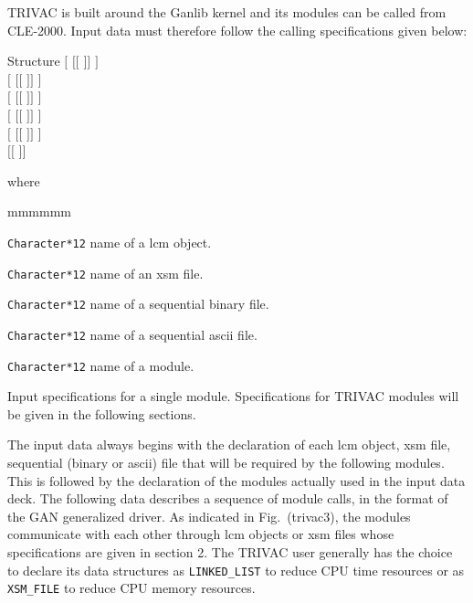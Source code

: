 TRIVAC is built around the Ganlib kernel and its modules can be called from CLE-2000.\cite{ganlib5,cle2000} Input data must therefore follow the calling specifications given below:

\begin{DataStructure}{Structure }
$[$  $[[$  $]]$ \moc{;} $]$ \\
$[$  $[[$  $]]$ \moc{;} $]$ \\
$[$  $[[$  $]]$ \moc{;} $]$ \\
$[$  $[[$  $]]$ \moc{;} $]$ \\
$[$  $[[$  $]]$ \moc{;} $]$ \\
$[[$  $]]$ \\
\end{DataStructure}

\noindent where
\begin{ListeDeDescription}{mmmmmm}

\item[\dusa{NAME1}] {\tt Character*12} name of a {\sc lcm} object.

\item[\dusa{NAME2}] {\tt Character*12} name of an {\sc xsm} file.

\item[\dusa{NAME3}] {\tt Character*12} name of a sequential binary file.

\item[\dusa{NAME4}] {\tt Character*12} name of a sequential {\sc ascii} file.

\item[\dusa{NAME5}] {\tt Character*12} name of a module.

\item[\dstr{specif}] Input specifications for a single module. Specifications for TRIVAC modules will be given in the following sections.

\end{ListeDeDescription}

The input data always begins with the declaration of each {\sc lcm} object, {\sc xsm}
file, sequential (binary or {\sc ascii}) file that will be required
by the following modules. This is followed by the declaration of the modules actually used in the input data deck. The following data describes a sequence of module calls, in the format of the GAN generalized driver. As indicated in Fig.~\fig(trivac3), the modules communicate with each other through {\sc lcm} objects or {\sc xsm} files whose specifications are given in section 2. The TRIVAC user generally has the choice to declare its data structures as {\tt LINKED\_LIST} to reduce CPU time resources or as {\tt XSM\_FILE} to reduce CPU memory resources.

